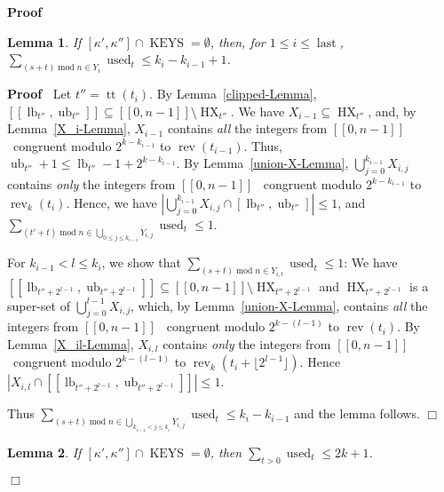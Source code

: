 \documentclass{article}
\newcommand{\tmem}[1]{{\em #1\/}}
\newcommand{\tmop}[1]{\ensuremath{\operatorname{#1}}}
\newenvironment{proof}{\noindent\textbf{Proof\ }}{\hspace*{\fill}$\Box$\medskip}
\newtheorem{lemma}{Lemma}
\begin{document}
\begin{proof}
  \begin{lemma}
    \label{next-tree-Lemma} If $[\kappa', \kappa''] \cap \tmop{KEYS} =
    \emptyset$, then, for $1 \leq i \leq \tmop{last}$, $\sum_{(s + t)
    \tmop{mod} n \in Y_i} \tmop{used}_t \leq k_i - k_{i - 1} + 1$.
  \end{lemma}
  
  \begin{proof}
    Let $t'' = \tmop{tt} (t_i)$. By
    Lemma~\ref{clipped-Lemma}, $[[\tmop{lb}_{t''}, \tmop{ub}_{t''}]] \subseteq
    [[0, n - 1]] \setminus \tmop{HX}_{t''}$. We have $X_{i - 1} \subseteq
    \tmop{HX}_{t''}$, and, by Lemma~\ref{X_i-Lemma}, $X_{i - 1}$ contains
    {\tmem{all}} the integers from $[[0, n - 1]]$ \ congruent modulo $2^{k -
    k_{i - 1}}$ to $\tmop{rev} (t_{i - 1})$. Thus, $\tmop{ub}_{t''} + 1 \leq
    \tmop{lb}_{t''} - 1 + 2^{k - k_{i - 1}}$. By Lemma~\ref{union-X-Lemma},
    $\bigcup_{j = 0}^{k_{i - 1}} X_{i, j}$ contains {\tmem{only}} the integers
    from $[[0, n - 1]]$ \ congruent modulo $2^{k - k_{i - 1}}$ to
    $\tmop{rev}_k (t_i)$. Hence, we have $| \bigcup_{j = 0}^{k_{i - 1}} X_{i,
    j} \cap [\tmop{lb}_{t''}, \tmop{ub}_{t''}] | \leq 1$, and $\sum_{(t' + t)
    \tmop{mod} n \in \bigcup_{0 \leq j \leq k_{i - 1}} Y_{i, j}} \tmop{used}_t
    \leq 1$.
    
    For $k_{i - 1} < l \leq k_i$, we show that $\sum_{(s + t) \tmop{mod} n
    \in Y_{i, l}} \tmop{used}_t \leq 1$: We have $[[\tmop{lb}_{t'' + 2^{l -
    1}}, \tmop{ub}_{t'' + 2^{l - 1}}]] \subseteq [[0, n - 1]] \setminus
    \tmop{HX}_{t'' + 2^{l - 1}}$ and $\tmop{HX}_{t'' + 2^{l - 1}}$ is a
    super-set of $\bigcup_{j = 0}^{l - 1} X_{i, j}$, which, by
    Lemma~\ref{union-X-Lemma}, contains {\tmem{all}} the integers from $[[0, n
    - 1]]$ \ congruent modulo $2^{k - (l - 1)}$ to $\tmop{rev} (t_i)$. By
    Lemma~\ref{X_il-Lemma}, $X_{i, l}$ contains {\tmem{only}} the integers
    from $[[0, n - 1]]$ \ congruent modulo $2^{k - (l - 1)}$ to $\tmop{rev}_k
    (t_i + \lfloor 2^{l - 1} \rfloor)$. Hence $|X_{i, l} \cap [[\tmop{lb}_{t''
    + 2^{l - 1}}, \tmop{ub}_{t'' + 2^{l - 1}}]] | \leq 1$. 

Thus $\sum_{(s + t)
    \tmop{mod} n \in \bigcup_{k_{i - 1} < j \leq k_i} Y_{i, j}} \tmop{used}_t
    \leq k_i - k_{i - 1}$ and the lemma follows.
  \end{proof}
  
  \begin{lemma}
    \label{total-Lemma} If $[\kappa', \kappa''] \cap \tmop{KEYS} = \emptyset$,
    then $\sum_{t > 0} \tmop{used}_t \leq 2 k + 1$.
  \end{lemma}
  

\end{proof}
\end{document}
